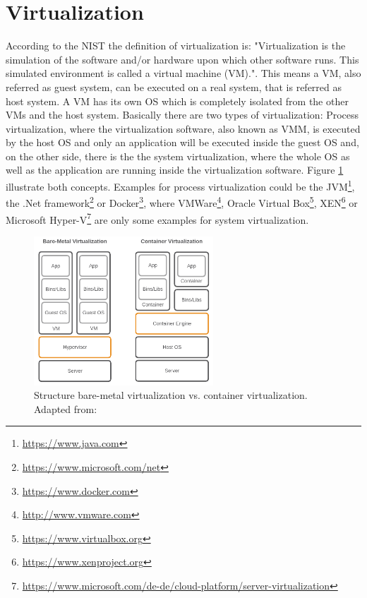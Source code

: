 \section{Virtualization}
\label{section:state_virtualization}
According to the \ac{NIST} the definition of virtualization is: "Virtualization is the simulation of the software and/or hardware upon which other software runs. This simulated environment is called a virtual machine (VM)."\autocite[p. ES-1]{Sca:2011}.
This means a \ac{VM}, also referred as guest system, can be executed on a real system, that is referred as host system.
A \ac{VM} has its own \ac{OS} which is completely isolated from the other \acp{VM} and the host system.\autocite[cf.][p. 2]{Celesti:2016}
Basically there are two types of virtualization: Process virtualization, where the virtualization software, also known as \ac{VMM}, is executed by the host \ac{OS} and only an application will be executed inside the guest \ac{OS} and, on the other side, there is the the system virtualization, where the whole \ac{OS} as well as the application are running inside the virtualization software.
Figure \ref{fig:vms_vs_docker} illustrate both concepts.
Examples for process virtualization could be the \ac{JVM}\footnote{\url{https://www.java.com}}, the .Net framework\footnote{\url{https://www.microsoft.com/net}} or Docker\footnote{\url{https://www.docker.com}}, where VMWare\footnote{\url{http://www.vmware.com}}, Oracle Virtual Box\footnote{\url{https://www.virtualbox.org}}, XEN\footnote{\url{https://www.xenproject.org}} or Microsoft Hyper-V\footnote{\url{https://www.microsoft.com/de-de/cloud-platform/server-virtualization}} are only some examples for system virtualization.

\begin{figure}[H]
    \centering
    \includegraphics[width=0.6\textwidth]{resources/images/vm_vs_container.png}
    \caption[Structure bare-metal virtualization vs. container virtualization]{Structure bare-metal virtualization vs. container virtualization. Adapted from: \autocite[p. 2]{Gallagher:2015}}
    \label{fig:vms_vs_docker}
\end{figure}

